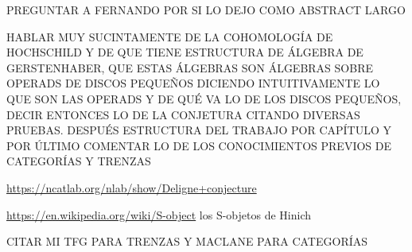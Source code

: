 \documentclass[TFM.tex]{subfiles}
\begin{document}

PREGUNTAR A FERNANDO  POR SI LO DEJO COMO ABSTRACT LARGO

HABLAR MUY SUCINTAMENTE DE LA COHOMOLOGÍA DE HOCHSCHILD Y DE QUE TIENE ESTRUCTURA DE ÁLGEBRA DE GERSTENHABER, QUE ESTAS ÁLGEBRAS SON ÁLGEBRAS SOBRE OPERADS DE DISCOS PEQUEÑOS DICIENDO INTUITIVAMENTE LO QUE SON LAS OPERADS Y DE QUÉ VA LO DE LOS DISCOS PEQUEÑOS, DECIR ENTONCES LO DE LA CONJETURA CITANDO DIVERSAS PRUEBAS. DESPUÉS ESTRUCTURA DEL TRABAJO POR CAPÍTULO Y POR ÚLTIMO COMENTAR LO DE LOS CONOCIMIENTOS PREVIOS DE CATEGORÍAS Y TRENZAS

\url{https://ncatlab.org/nlab/show/Deligne+conjecture}

\url{https://en.wikipedia.org/wiki/S-object} los S-objetos de Hinich

CITAR MI TFG PARA TRENZAS Y MACLANE PARA CATEGORÍAS
\end{document}
